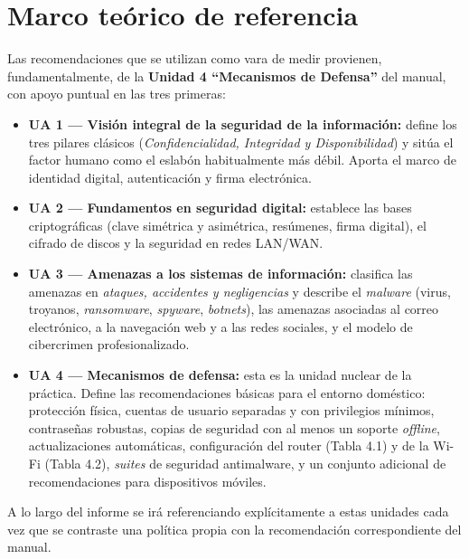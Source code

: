 \section{Marco teórico de referencia}

Las recomendaciones que se utilizan como vara de medir provienen, fundamentalmente, de la \textbf{Unidad 4 ``Mecanismos de Defensa''} del manual, con apoyo puntual en las tres primeras:

\begin{itemize}[leftmargin=*]
    \item \textbf{UA 1 --- Visión integral de la seguridad de la información:} define los tres pilares clásicos (\textit{Confidencialidad, Integridad y Disponibilidad}) y sitúa el factor humano como el eslabón habitualmente más débil. Aporta el marco de identidad digital, autenticación y firma electrónica.
    \item \textbf{UA 2 --- Fundamentos en seguridad digital:} establece las bases criptográficas (clave simétrica y asimétrica, resúmenes, firma digital), el cifrado de discos y la seguridad en redes LAN/WAN.
    \item \textbf{UA 3 --- Amenazas a los sistemas de información:} clasifica las amenazas en \textit{ataques, accidentes y negligencias} y describe el \textit{malware} (virus, troyanos, \textit{ransomware}, \textit{spyware}, \textit{botnets}), las amenazas asociadas al correo electrónico, a la navegación web y a las redes sociales, y el modelo de cibercrimen profesionalizado.
    \item \textbf{UA 4 --- Mecanismos de defensa:} esta es la unidad nuclear de la práctica. Define las recomendaciones básicas para el entorno doméstico: protección física, cuentas de usuario separadas y con privilegios mínimos, contraseñas robustas, copias de seguridad con al menos un soporte \textit{offline}, actualizaciones automáticas, configuración del router (Tabla 4.1) y de la Wi-Fi (Tabla 4.2), \textit{suites} de seguridad antimalware, y un conjunto adicional de recomendaciones para dispositivos móviles.
\end{itemize}

A lo largo del informe se irá referenciando explícitamente a estas unidades cada vez que se contraste una política propia con la recomendación correspondiente del manual.
